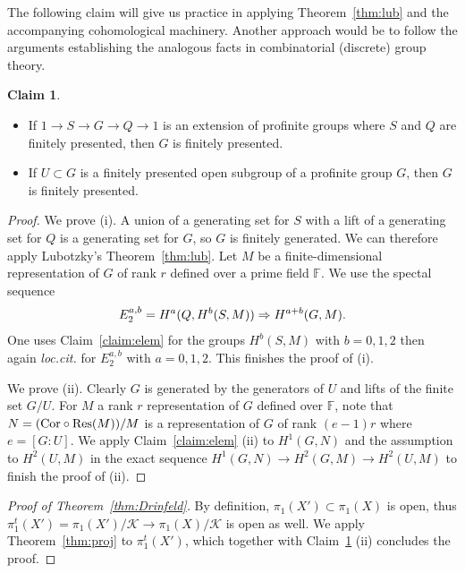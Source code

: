 \documentclass[12pt]{amsart}
\theoremstyle{plain}
\theoremstyle{definition}
\newtheorem{claim}[thm]{Claim}
\numberwithin{thm}{section}
\newcommand{\ga}[2]{\begin{gather}\label{#1}#2 \end{gather}}
\newcommand{\sK}{{\mathcal K}}
\newcommand{\F}{{\mathbb F}}
\numberwithin{equation}{section}
\begin{document}
The following claim will give us practice in applying Theorem~\ref{thm:lub} and the accompanying cohomological machinery. 
Another approach would be to follow the arguments establishing the analogous facts in combinatorial (discrete) group theory.

\begin{claim}  \label{claim:lub}
\begin{itemize}
\item[(i)] 
If $1\to S\to G\to Q \to 1$ is an extension of profinite groups where $S$ and $Q$ are finitely presented,  then  $G$ is finitely presented. 
\item[(ii)] If $U\subset G$ is a finitely presented open subgroup of a profinite group $G$, then $G$ is finitely presented.

\end{itemize}
\end{claim}
\begin{proof} We prove (i). 
A union of a generating set for $S$ with a lift of a generating set for $Q$ is a generating set for $G$, so $G$ is finitely generated.
We can therefore apply Lubotzky's Theorem~\ref{thm:lub}. 
Let $M$ be a finite-dimensional representation of $G$ of rank $r$ defined over a prime field $\F$. 
We use the spectal sequence
\ga{}{ E_2^{a,b}= H^a(Q, H^b(S, M)) \Rightarrow   H^{a+b}( G, M). \notag}
One uses Claim~\ref{claim:elem} for the groups $H^b(S, M)$ with $b=0,1,2$ then 
again {\it loc.cit.} for $E_2^{a,b}$ with $a=0,1,2$. This finishes the proof of (i). 

We prove (ii).  Clearly $G$ is generated by the generators of $U$ and lifts of the finite set $G/U$. For $M$ a rank $r$ representation of $G$ defined over $\F$, note that $N=({\rm Cor}\circ {\rm Res} (M))/M$ is a representation of $G$ of rank $(e-1)r$ where $e=[G:U]$. We apply 
Claim~\ref{claim:elem} (ii) to $H^1(G, N)$ and the assumption to $H^2(U, M)$  in the exact sequence $H^1(G, N)\to H^2(G, M)\to H^2(U, M)$ to finish the proof of (ii).

\end{proof}


\begin{proof}[Proof of Theorem~\ref{thm:Drinfeld}]


By definition, $\pi_1(X')\subset \pi_1(X)$ is open, thus $\pi_1^t(X')= \pi_1(X')/\sK\to \pi_1(X)/\sK$ is open as well. 
We apply Theorem~\ref{thm:proj} to $\pi^t_1(X')$, which together with Claim~\ref{claim:lub} (ii)   concludes the proof. 





\end{proof}
\end{document}
